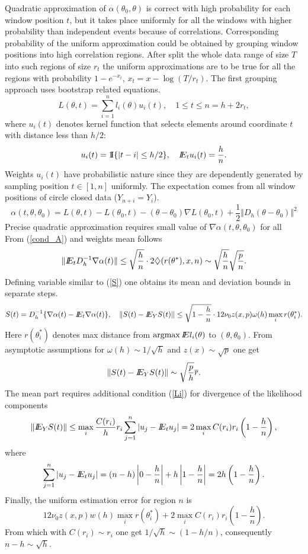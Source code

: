 Quadratic approximation of $\alpha(\theta_0, \theta)$ is correct with high probability for each window position $t$, but it takes place uniformly for all the windows with higher probability than independent events because of correlations. Corresponding probability of the uniform approximation could be obtained by grouping window positions into high correlation regions. 
After split the whole data range of size $T$ into such regions of size $r_t$ the uniform approximations are to be true for all the regions with probability $1 - e^{-x_t}$, $x_t = x - \log(T/r_t)$. 
The first grouping approach uses bootstrap related equations.  
\[
L(\theta, t) = \sum_{i=1}^{n} l_i(\theta) u_i(t),
\quad
1 \leq t \leq n = h + 2r_t,
\]
where $u_i(t)$ denotes kernel function that selects elements around coordinate $t$ with distance less than $h/2$: 
\[
u_i(t) = \operatorname{1}\hspace{-4.3pt}\operatorname{I}\{|t - i| \leq h/2\}, 
\quad I\!\!E_t u_i(t) = \frac{h}{n}.
\]
Weights $u_i(t)$ have probabilistic nature since they are dependently generated by sampling position $t \in [1,n]$ uniformly.  The expectation comes from all window positions of circle closed data ($Y_{n+i} = Y_i$). 
\[
\alpha(t, \theta, \theta_0) = L(\theta, t) -  L(\theta_0, t)  - (\theta - \theta_0)  \nabla  L(\theta_0, t) + \frac{1}{2} \Vert D_h (\theta - \theta_0) \Vert^2 
\]
Precise quadratic approximation requires small value of $ \nabla \alpha(t, \theta, \theta_0) $ for all  From (\ref{cond_A}) and weights mean follows
\[
\Vert I\!\!E_t D_{h}^{-1} \nabla \alpha(t) \Vert \leq \sqrt{\frac{h}{n}} \cdot 2 \diamondsuit(r(\theta^*), x, n) \sim \sqrt{\frac{h}{n}} \sqrt{\frac{p}{n}}.
\]
Defining variable similar to (\ref{S}) one obtains its mean and deviation bounds  in separate steps.
\[
S(t) = D_h^{-1} \{\nabla \alpha(t) -  I\!\!E_t \nabla \alpha(t) \},
\quad 
\Vert S(t) - I\!\!E_{Y} S(t) \Vert \leq \sqrt{1 - \frac{h}{n}} \cdot 12 \nu_0 z(x,p) \omega(h) \max_i r(\theta^*_i).
\]
Here $r(\theta^*_i)$ denotes max distance from $\argmax \E l_i (\theta)$ to $(\theta, \theta_0)$. From asymptotic assumptions for $\omega(h) \sim 1 /\sqrt{h}$ and $z(x) \sim \sqrt{p}$	 one get 
\[
\Vert S(t) - I\!\!E_Y S(t) \Vert \sim \sqrt{\frac{p}{h}} \overline{r}.
\]
The mean part requires additional condition (\ref{Li}) for divergence of the likelihood components     
\[	
\Vert I\!\!E_Y S(t) \Vert \leq  \max_i \frac{C(r_i)}{h} r_i  \sum_{j=1}^{n} | u_j - I\!\!E_t u_j |  = 2 \max_i C(r_i) r_i \left( 1 - \frac{h}{n}  \right),
\]
where 
\[
 \sum_{j=1}^{n} | u_j - I\!\!E_t u_j |  = (n - h) \left | 0 - \frac{h}{n} \right | +  h \left | 1 - \frac{h}{n} \right | = 2 h \left(1- \frac{h}{n} \right).
\]
Finally, the uniform estimation error for region $n$ is
\[
 12 \nu_0 z(x,p) w(h) \max_i r(\theta^*_i) + 2 \max_i C(r_i) r_i \left( 1 - \frac{h}{n}  \right).
\]
From which with $C(r_i) \sim 	r_i$ one get  $ 1 / \sqrt{h} \sim  (1- h/n) $, consequently  $n - h \sim \sqrt{h}$.

